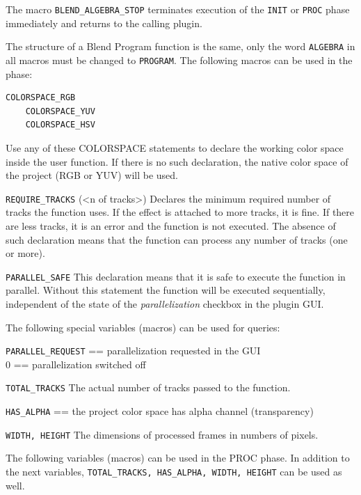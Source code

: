 The macro \texttt{BLEND\_ALGEBRA\_STOP} terminates execution of the \texttt{INIT} or \texttt{PROC} phase immediately and returns to the calling plugin.

The structure of a Blend Program function is the same, only the word \texttt{ALGEBRA} in all macros must be changed to \texttt{PROGRAM}. The following macros can be used in the  phase:

\begin{lstlisting}[style=sh]
	COLORSPACE_RGB
	COLORSPACE_YUV
	COLORSPACE_HSV
\end{lstlisting}


Use any of these COLORSPACE statements to declare the working color space inside the user function. If there is no such declaration, the native color space of the project (RGB or YUV) will be used.

\texttt{REQUIRE\_TRACKS} (<n of tracks>) \newline
Declares the minimum required number of tracks the function uses. If the effect is attached to more tracks, it is fine. If there are less tracks, it is an error and the function is not executed. The absence of such declaration means that the function can process any number of tracks (one or more).

\texttt{PARALLEL\_SAFE} \newline
This declaration means that it is safe to execute the function in parallel. Without this statement the function will be executed sequentially, independent of the state of the \textit{parallelization} checkbox in the plugin GUI.

The following special variables (macros) can be used for queries:

\texttt{PARALLEL\_REQUEST}  == parallelization requested in the GUI \\
0 == parallelization switched off

\texttt{TOTAL\_TRACKS} \newline
The actual number of tracks passed to the function.

\texttt{HAS\_ALPHA}  == the project color space has alpha channel (transparency)

\texttt{WIDTH, HEIGHT} \newline
The dimensions of processed frames in numbers of pixels.

The following variables (macros) can be used in the PROC phase.
In addition to the next variables, \texttt{TOTAL\_TRACKS, HAS\_ALPHA, WIDTH, HEIGHT} can be used as well. \newline

